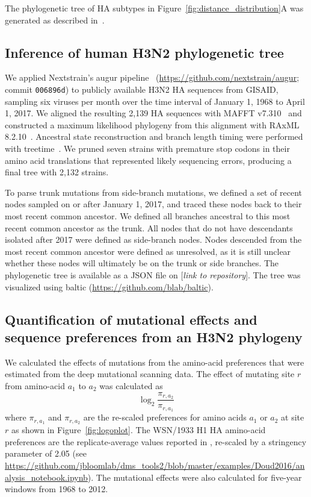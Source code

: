 \documentclass[9pt,twocolumn,twoside]{pnas-new}
\newcommand{\comment}[1]{{\color{red}[\textsl{#1}]}}
\begin{document}
{The phylogenetic tree of HA subtypes in Figure~\ref{fig:distance_distribution}A was generated as described in~\cite{doud2017quantifying}.

\subsection*{Inference of human H3N2 phylogenetic tree}
We applied Nextstrain's augur pipeline~\cite{Hadfield224048} (\url{https://github.com/nextstrain/augur}; commit \texttt{006896d}) to publicly available H3N2 HA sequences from GISAID, sampling six viruses per month over the time interval of January 1, 1968 to April 1, 2017.
We aligned the resulting 2,139 HA sequences with MAFFT v7.310~\cite{katoh2013mafft} and constructed a maximum likelihood phylogeny from this alignment with RAxML 8.2.10~\cite{stamatakis2006raxml}.
Ancestral state reconstruction and branch length timing were performed with treetime~\cite{Sagulenko2018}.
We pruned seven strains with premature stop codons in their amino acid translations that represented likely sequencing errors, producing a final tree with 2,132 strains.

To parse trunk mutations from side-branch mutations, we defined a set of recent nodes sampled on or after January 1, 2017, and traced these nodes back to their most recent common ancestor.
We defined all branches ancestral to this most recent common ancestor as the trunk.
All nodes that do not have descendants isolated after 2017 were defined as side-branch nodes.
Nodes descended from the most recent common ancestor were defined as unresolved, as it is still unclear whether these nodes will ultimately be on the trunk or side branches.
The phylogenetic tree is available as a JSON file on \comment{link to repository}.
The tree was visualized using baltic (\url{https://github.com/blab/baltic}).

\subsection*{Quantification of mutational effects and sequence preferences from an H3N2 phylogeny}
We calculated the effects of mutations from the amino-acid preferences that were estimated from the deep mutational scanning data.
The effect of mutating site $r$ from amino-acid $a_1$ to $a_2$ was calculated as
\begin{equation}
\log_2 \frac{\pi_{r,a_2}}{\pi_{r,a_1}}
\end{equation}
where $\pi_{r,a_1}$ and $\pi_{r,a_2}$ are the re-scaled preferences for amino acids $a_1$ or $a_2$ at site $r$ as shown in Figure~\ref{fig:logoplot}.
The WSN/1933 H1 HA amino-acid preferences are the replicate-average values reported in \cite{doud2016accurate}, re-scaled by a stringency parameter of 2.05 (see \url{https://github.com/jbloomlab/dms_tools2/blob/master/examples/Doud2016/analysis_notebook.ipynb}).
The mutational effects were also calculated for five-year windows from 1968 to 2012.

}
\end{document}
